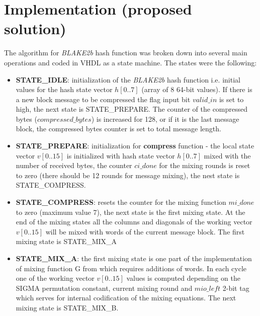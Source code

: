 \documentclass[%
	a4paper,
]
{article}
\begin{document}
\section{Implementation (proposed solution)}
\label{sec:solution}
The algorithm for \emph{BLAKE2b} hash function was broken down into several main operations and coded in VHDL as a state machine. The states were the following:
\begin{itemize}
	\item \textbf{STATE_IDLE}: initialization of the \emph{BLAKE2b} hash function i.e. initial values for the hash state vector $h[0..7]$ (array of 8 64-bit values). If there is a new block message to be compressed the flag input bit $valid\_in$ is set to high, the next state is STATE_PREPARE. The counter of the compressed bytes ($compressed\_bytes$) is increased for 128, or if it is the last message block, the compressed bytes counter is set to total message length.
	\item \textbf{STATE_PREPARE}: initialization for \textbf{compress} function - the local state vector $v[0..15]$ is initialized with hash state vector $h[0..7]$ mixed with the number of received bytes, the counter $ci\_done$ for the mixing rounds is reset to zero (there should be 12 rounds for message mixing), the nest state is STATE_COMPRESS.
	\item \textbf{STATE_COMPRESS}: resets the counter for the mixing function $mi\_done$ to zero (maximum value 7), the next state is the first mixing state. At the end of the mixing states all the columns and diagonals of the working vector $v[0..15]$ will be mixed with words of the current message block. The first mixing state is STATE_MIX_A
	\item \textbf{STATE_MIX_A}: the first mixing state is one part of the implementation of mixing function G from \autocite{rfc7693} which requires additions of words. In each cycle one of the working vector $v[0..15]$ values is  computed depending on the SIGMA permutation constant, current mixing round and $mio\_left$ 2-bit tag which serves for internal codification of the mixing equations. The next mixing state is STATE_MIX_B.

\end{itemize}
\end{document}
